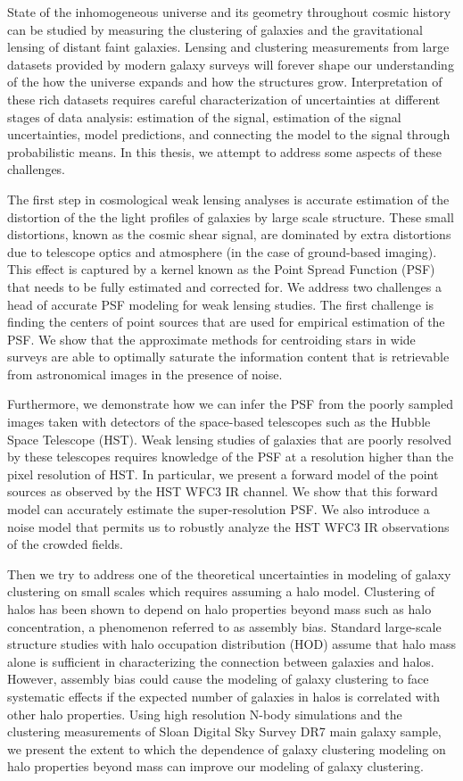 State of the inhomogeneous universe and its geometry throughout cosmic history can be studied by measuring the clustering of galaxies and the gravitational lensing of distant faint galaxies. Lensing and clustering measurements from large datasets provided by modern galaxy surveys will forever shape our understanding of the how the universe expands and how the structures grow. Interpretation of these rich datasets requires careful characterization of uncertainties at different stages of data analysis: estimation of the signal, estimation of the signal uncertainties, model predictions, and connecting the model to the signal through probabilistic means. In this thesis, we attempt to address some aspects of these challenges.  

The first step in cosmological weak lensing analyses is accurate estimation of the distortion of the the light profiles of galaxies by large scale structure. These small distortions, known as the cosmic shear signal, are dominated by extra distortions due to telescope optics and atmosphere (in the case of ground-based imaging). This effect is captured by a kernel known as the Point Spread Function (PSF) that needs to be fully estimated and corrected for. We address two challenges a head of accurate PSF modeling for weak lensing studies. The first challenge is finding the centers of point sources that are used for empirical estimation of the PSF. We show that the approximate methods for centroiding stars in wide surveys are able to optimally saturate the information content that is retrievable from astronomical images in the presence of noise. 

Furthermore, we demonstrate how we can infer the PSF from the poorly sampled images taken with detectors of the space-based telescopes such as the Hubble Space Telescope (HST). 
Weak lensing studies of galaxies that are poorly resolved by these telescopes requires knowledge of the PSF at a resolution higher than the pixel resolution of HST. 
In particular, we present a forward model of the point sources as observed by the HST WFC3 IR channel. We show that this forward model can accurately estimate the super-resolution PSF. We also introduce a noise model that permits us to robustly analyze the HST WFC3 IR observations of the crowded fields.    

Then we try to address one of the theoretical uncertainties in modeling of galaxy clustering on small scales which requires assuming a halo model. Clustering of halos has been shown to depend on halo properties beyond mass such as halo concentration, a phenomenon referred to as assembly bias. Standard large-scale structure studies with halo occupation distribution (HOD) assume that halo mass alone is sufficient in characterizing the connection between galaxies and halos. However, assembly bias could cause the modeling of galaxy clustering to face systematic effects if the expected number of galaxies in halos is correlated with other halo properties. Using high resolution N-body simulations and the clustering measurements of Sloan Digital Sky Survey DR7 main galaxy sample, we present the extent to which the dependence of galaxy clustering modeling on halo properties beyond mass can improve our modeling of galaxy clustering.

